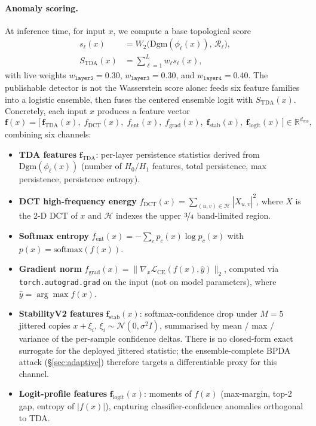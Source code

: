 \paragraph{Anomaly scoring.}
At inference time, for input $x$, we compute a base topological score
\begin{align}
  s_\ell(x) &= W_2\bigl(\mathrm{Dgm}(\phi_\ell(x)),\, \mathcal{R}_\ell\bigr), \\
  S_\mathrm{TDA}(x) &= \sum_{\ell=1}^L w_\ell s_\ell(x),
  \label{eq:score}
\end{align}
with live weights $w_{\texttt{layer2}}=0.30$,
$w_{\texttt{layer3}}=0.30$, and $w_{\texttt{layer4}}=0.40$.
The publishable detector is not the Wasserstein score alone: \prism feeds
six feature families into a logistic ensemble, then fuses the centered
ensemble logit with $S_\mathrm{TDA}(x)$. Concretely, each input $x$
produces a feature vector
\[
  \mathbf{f}(x) =
  \bigl[\,
    \mathbf{f}_\mathrm{TDA}(x),\;
    f_\mathrm{DCT}(x),\;
    f_\mathrm{ent}(x),\;
    f_\mathrm{grad}(x),\;
    \mathbf{f}_\mathrm{stab}(x),\;
    \mathbf{f}_\mathrm{logit}(x)
  \,\bigr] \in \mathbb{R}^{d_\text{ens}},
\]
combining six channels:
\begin{itemize}[leftmargin=*,noitemsep]
  \item \textbf{TDA features} $\mathbf{f}_\mathrm{TDA}$: per-layer
    persistence statistics derived from $\mathrm{Dgm}(\phi_\ell(x))$
    (number of $H_0/H_1$ features, total persistence, max persistence,
    persistence entropy).
  \item \textbf{DCT high-frequency energy} $f_\mathrm{DCT}(x) =
    \sum_{(u,v) \in \mathcal{H}} |X_{u,v}|^2$, where $X$ is the 2-D DCT
    of $x$ and $\mathcal{H}$ indexes the upper $\nicefrac{3}{4}$
    band-limited region.
  \item \textbf{Softmax entropy}
    $f_\mathrm{ent}(x) = -\sum_c p_c(x) \log p_c(x)$ with
    $p(x)=\mathrm{softmax}(f(x))$.
  \item \textbf{Gradient norm}
    $f_\mathrm{grad}(x) = \|\nabla_x \mathcal{L}_\text{CE}(f(x), \hat{y})\|_2$,
    computed via \texttt{torch.autograd.grad} on the input (not on
    model parameters), where $\hat{y}=\arg\max f(x)$.
  \item \textbf{StabilityV2 features} $\mathbf{f}_\mathrm{stab}(x)$:
    softmax-confidence drop under $M{=}5$ jittered copies
    $x + \xi_i,\, \xi_i \sim \mathcal{N}(0,\sigma^2 I)$,
    summarised by mean / max / variance of the per-sample confidence
    deltas. There is no closed-form exact surrogate for the deployed
    jittered statistic; the ensemble-complete BPDA attack
    (\S\ref{sec:adaptive}) therefore targets a differentiable proxy for
    this channel.
  \item \textbf{Logit-profile features} $\mathbf{f}_\mathrm{logit}(x)$:
    moments of $f(x)$ (max-margin, top-2 gap, entropy of $|f(x)|$),
    capturing classifier-confidence anomalies orthogonal to TDA.
\end{itemize}
